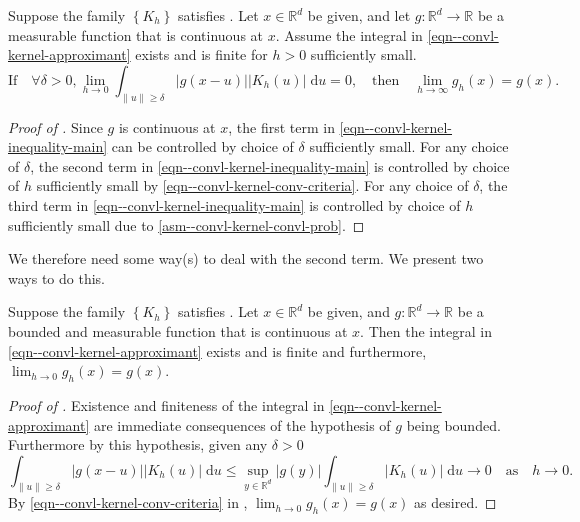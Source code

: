 \begin{lemma}
\label{lem--convl-kernel-conv-criteria}
Suppose the family \(\left\{ K_{h} \right\}\) satisfies
.
Let \(x \in \mathbb{R}^{d}\) be given, and let \(g : \mathbb{R}^{d} \to
\mathbb{R}\) be a measurable function that is continuous at \(x\).
Assume the integral in \eqref{eqn--convl-kernel-approximant} exists and is
finite for \(h > 0\) sufficiently small.
\begin{equation}
  \text{If} \quad
  \forall \delta > 0, \lim_{h \to 0} \int_{\|u\| \geq \delta} |g
  (x - u)| \left| K_{h} (u) \right| \; \mathrm{d} u = 0,
  \quad \text{then} \quad
  \lim_{h \to \infty} g_{h} (x) = g (x).
  \label{eqn--convl-kernel-conv-criteria}
\end{equation}
\end{lemma}

\begin{proof}[Proof of ]
Since \(g\) is continuous at \(x\), the first term in
\eqref{eqn--convl-kernel-inequality-main} can be controlled by choice of
\(\delta\) sufficiently small.
For any choice of \(\delta\), the second term in
\eqref{eqn--convl-kernel-inequality-main} is controlled by choice of \(h\)
sufficiently small by
\eqref{eqn--convl-kernel-conv-criteria}.
For any choice of \(\delta\), the third term in
\eqref{eqn--convl-kernel-inequality-main} is controlled by choice of \(h\)
sufficiently small due to 
\ref{asm--convl-kernel-convl-prob}.
\end{proof}

We therefore need some way(s) to deal with the second term.
We present two ways to do this.

\begin{theorem}
\label{thm--convl-kernel-conv-bounded}
Suppose the family \(\left\{ K_{h} \right\}\) satisfies
.
Let \(x \in \mathbb{R}^{d}\) be given, and \(g : \mathbb{R}^{d} \to \mathbb{R}\)
be a bounded and measurable function that is continuous at \(x\).
Then the integral in \eqref{eqn--convl-kernel-approximant} exists and is finite
and furthermore, \(\lim_{h \to 0} g_{h} (x) = g (x)\).
\end{theorem}

\begin{proof}[Proof of ]
Existence and finiteness of the integral in
\eqref{eqn--convl-kernel-approximant} are immediate consequences of the
hypothesis of \(g\) being bounded.
Furthermore by this hypothesis, given any \(\delta > 0\)
\begin{equation*}
  \int_{\|u\| \geq \delta} |g (x - u)| \left| K_{h} (u) \right| \; \mathrm{d} u
  \leq \sup_{y \in \mathbb{R}^{d}} |g (y)| \int_{\|u\| \geq \delta}
  \left| K_{h} (u) \right| \; \mathrm{d} u \to 0 \quad \text{as} \quad h \to 0.
\end{equation*}
By \eqref{eqn--convl-kernel-conv-criteria} in
, \(\lim_{h \to 0} g_{h} (x) = g (x)\) as
desired.
\end{proof}

